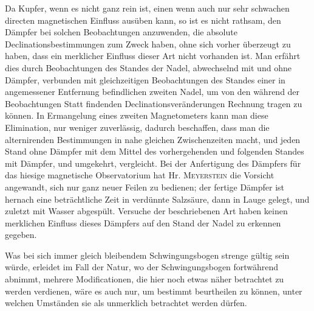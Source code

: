 Da Kupfer, wenn es nicht ganz rein ist, einen wenn auch nur sehr schwachen directen magnetischen Einfluss ausüben kann, so ist es nicht rathsam, den Dämpfer bei solchen Beobachtungen anzuwenden, die absolute Declinationsbestimmungen zum Zweck haben, ohne sich vorher überzeugt zu haben, dass ein merklicher Einfluss dieser Art nicht vorhanden ist. Man erfährt dies durch Beobachtungen des Standes der Nadel, abwechselnd mit und ohne Dämpfer, verbunden mit gleichzeitigen Beobachtungen des Standes einer in angemessener Entfernung befindlichen zweiten Nadel, um von den während der Beobachtungen Statt findenden Declinationsveränderungen Rechnung tragen zu können. In Ermangelung eines zweiten Magnetometers kann man diese Elimination, nur weniger zuverlässig, dadurch beschaffen, dass man die alternirenden Bestimmungen in nahe gleichen Zwischenzeiten macht, und jeden Stand ohne Dämpfer mit dem Mittel des vorhergehenden und folgenden Standes mit Dämpfer, und umgekehrt, vergleicht. Bei der Anfertigung des Dämpfers für das hiesige magnetische Observatorium hat Hr. \textsc{Meyerstein} die Vorsicht angewandt, sich nur ganz neuer Feilen zu bedienen; der fertige Dämpfer ist hernach eine beträchtliche Zeit in verdünnte Salzsäure, dann in Lauge gelegt, und zuletzt mit Wasser abgespült. Versuche der beschriebenen Art haben keinen merklichen Einfluss dieses Dämpfers auf den Stand der Nadel zu erkennen gegeben.

Was bei sich immer gleich bleibendem Schwingungsbogen strenge gültig sein würde, erleidet im Fall der Natur, wo der Schwingungsbogen fortwährend abnimmt, mehrere Modificationen, die hier noch etwas näher betrachtet zu werden verdienen, wäre es auch nur, um bestimmt beurtheilen zu können, unter welchen Umständen sie als unmerklich betrachtet werden dürfen.

